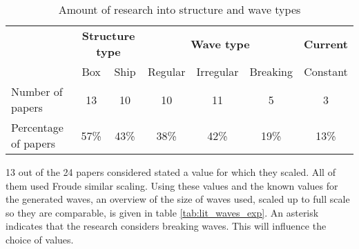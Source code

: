 \begin{table}[]
	\caption{Amount of research into structure and wave types}
	\begin{tabular}{l|cc|ccc|c|}
		\multicolumn{1}{c|}{\textbf{}} & \multicolumn{2}{c|}{\textbf{Structure type}} & \multicolumn{3}{c|}{\textbf{Wave type}} & 
		\multicolumn{1}{c|}{\textbf{Current}}\\
		\multicolumn{1}{c|}{}          & Box                   & Ship                 & Regular    & Irregular    & Breaking  & Constant  \\ \hline
		Number of papers               & 13                    & 10                   & 10         & 11           & 5  & 3         \\
		Percentage of papers           & 57\%                 & 43\%                & 38\%      & 42\%        & 19\%   &   13\% 
	\end{tabular}
\label{tab:lit_exp_structuren_wave}
\end{table}
13 out of the 24 papers considered stated a value for which they scaled. All of them used Froude similar scaling. Using these values and the known values for the generated waves, an overview of the size of waves used, scaled up to full scale so they are comparable, is given in table \ref{tab:lit_waves_exp}. An asterisk indicates that the research considers breaking waves. This will influence the choice of values.
